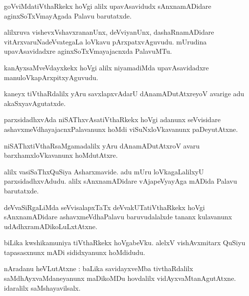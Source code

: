 \documentclass{article}
\begin{document}
\begin{mn}
goVviMdatiVthaRkekx hoVgi alilx upavAsavidudx sAnxnamADidare aginxSoTxVmayAgada Palavu barutatxde.
\end{mn}

\begin{mn}
alilxruva vishevxVshavxrananUnx, deVviyanUnx, dashaRnamADidare vitArxvaruNadeVvategaLa loVkavu
pArxpatxvAguvudu. mUrudina upavAsavidadxre aginxSoTxVmayajacnxda PalavuMTu.
\end{mn}

\begin{mn}
kanAyxsaMveVdayxkekx hoVgi alilx niyamadiMda upavAsavidadxre manuloVkapArxpitxyAguvudu.
\end{mn}

\begin{mn}
kaneyx tiVthaRdalilx yAru savxlapxvAdarU dAnamADutAtxreyoV avarige adu akaSxyavAgutatxde.
\end{mn}

\begin{mn}
parxsidadhxvAda niSAThxvAsatiVthaRkekx hoVgi adanunx seVvisidare ashavxmeVdhayajacnxPalavanunx 
hoMdi viSuNxloVkavanunx paDeyutAtxne.
\end{mn}

\begin{mn}
niSAThxtiVthaRsaMgamadalilx yAru dAnamADutAtxroV avaru barxhamxloVkavanunx hoMdutAtxre.
\end{mn}

\begin{mn}
alilx vasiSaThxQuSiya Asharxmavide. adu mUru loVkagaLalilxyU  parxsidadhxvAdudu. alilx 
sAnxnamADidare vAjapeVyayAga mADida Palavu barutatxde.
\end{mn}

\begin{mn}
deVvaSiRgaLiMda seVvisalapxTaTx deVvakUTatiVthaRkekx hoVgi sAnxnamADidare ashavxmeVdhaPalavu 
baruvudalalxde tananx kulavanunx udAdhxramADikoLuLxtAtxne.
\end{mn}

\begin{mn}
biLika kwshikamuniya tiVthaRkekx hoVgabeVku. alelxV vishAvxmitarx QuSiyu tapasasxnunx mADi
sididxyanunx hoMdidudu.
\end{mn}


\begin{mn}
nAradanu heVLutAtxne : baLika savidayxveMba tivthaRdalilx saMdhAyxvaMdaneyanunx maDikoMDu 
hovdalilx vidAyxvaMtanAgutAtxne. idaralilx saMshayavilsalx. 
\end{mn}
\end{document}
